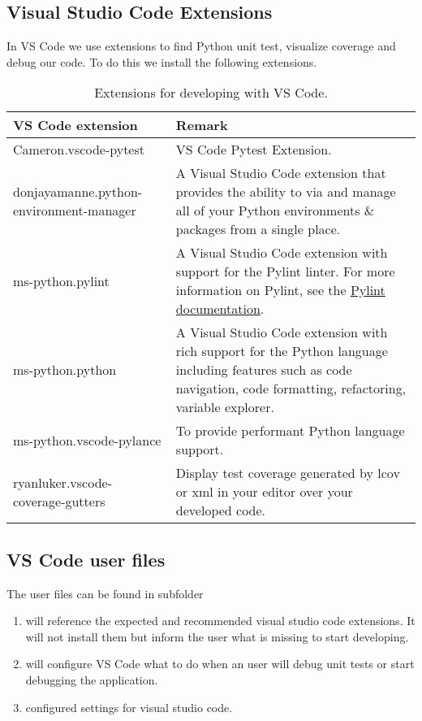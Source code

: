 \subsection{Visual Studio Code Extensions}
In VS Code we use extensions to find Python unit test, visualize coverage and debug our code.
To do this we install the following extensions.

\begin{longtable}{|p{4cm}|p{10cm}|}
	\caption{Extensions for developing with VS Code.} \\
	\hline
	\textbf{VS Code extension} & \textbf{Remark} \\ \hline
	\endfirsthead
	Cameron.vscode-pytest & VS Code Pytest Extension. \\ \hline
	donjayamanne.python-environment-manager & A Visual Studio Code extension that provides the ability to via and manage all of your Python environments \& packages from a single place. \\ \hline
	ms-python.pylint & A Visual Studio Code extension with support for the Pylint linter.
	For more information on Pylint, see the \href{https://pylint.readthedocs.io/}{Pylint documentation}. \\ \hline
	ms-python.python & A Visual Studio Code extension with rich support for the Python language including features such as code navigation, code formatting, refactoring, variable explorer. \\ \hline
	ms-python.vscode-pylance & To provide performant Python language support. \\ \hline
	ryanluker.vscode-coverage-gutters & Display test coverage generated by lcov or xml in your editor over your developed code. \\ \hline
\end{longtable}


\subsection{VS Code user files}
The user files can be found in subfolder 

\begin{enumerate}
	\item {} will reference the expected and recommended visual studio code extensions. It will not install them but inform the user what is missing to start developing.
	\item {} will configure VS Code what to do when an user will debug unit tests or start debugging the application.
	\item {} configured settings for visual studio code.
\end{enumerate}

